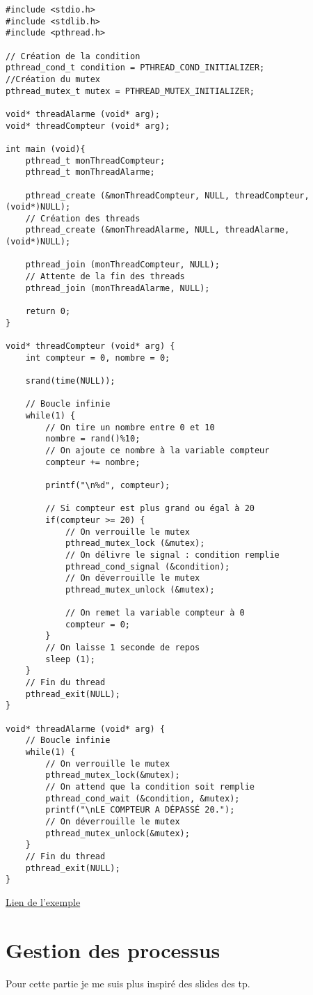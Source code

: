 \documentclass[a4paper]{article}
\begin{document}
\begin{lstlisting}
#include <stdio.h>
#include <stdlib.h>
#include <pthread.h>

// Création de la condition
pthread_cond_t condition = PTHREAD_COND_INITIALIZER;
//Création du mutex
pthread_mutex_t mutex = PTHREAD_MUTEX_INITIALIZER;

void* threadAlarme (void* arg);
void* threadCompteur (void* arg);

int main (void){
	pthread_t monThreadCompteur;
	pthread_t monThreadAlarme;

	pthread_create (&monThreadCompteur, NULL, threadCompteur, (void*)NULL);
    // Création des threads
	pthread_create (&monThreadAlarme, NULL, threadAlarme, (void*)NULL);

	pthread_join (monThreadCompteur, NULL);
    // Attente de la fin des threads
	pthread_join (monThreadAlarme, NULL);

	return 0;
}

void* threadCompteur (void* arg) {
	int compteur = 0, nombre = 0;

	srand(time(NULL));

    // Boucle infinie
	while(1) {
        // On tire un nombre entre 0 et 10
		nombre = rand()%10;
        // On ajoute ce nombre à la variable compteur
		compteur += nombre;

		printf("\n%d", compteur);

        // Si compteur est plus grand ou égal à 20
		if(compteur >= 20) {
            // On verrouille le mutex
			pthread_mutex_lock (&mutex);
            // On délivre le signal : condition remplie
			pthread_cond_signal (&condition);
            // On déverrouille le mutex
			pthread_mutex_unlock (&mutex);

            // On remet la variable compteur à 0
			compteur = 0;
		}
        // On laisse 1 seconde de repos
		sleep (1);
	}
    // Fin du thread
	pthread_exit(NULL);
}

void* threadAlarme (void* arg) {
    // Boucle infinie
	while(1) {
        // On verrouille le mutex
		pthread_mutex_lock(&mutex);
        // On attend que la condition soit remplie
		pthread_cond_wait (&condition, &mutex);
		printf("\nLE COMPTEUR A DÉPASSÉ 20.");
        // On déverrouille le mutex
		pthread_mutex_unlock(&mutex);
	}
    // Fin du thread
	pthread_exit(NULL);
}
\end{lstlisting}
\href{https://openclassrooms.com/courses/la-programmation-systeme-en-c-sous-unix/les-threads-3#/id/r-1515355}{Lien de l'exemple}
\section{Gestion des processus}
Pour cette partie je me suis plus inspiré des slides des tp.
\end{document}
